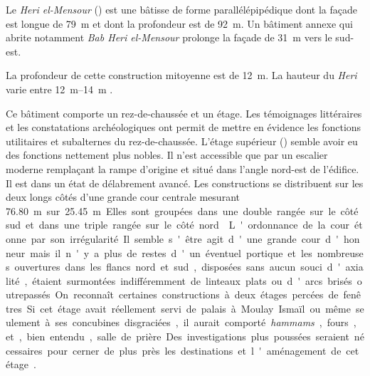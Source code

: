 Le \emph{Heri el-Mensour} () est une bâtisse de forme 
parallélépipédique dont la façade est longue de \SI{79}{\m} et dont la 
profondeur est de \SI{92}{\m}. Un bâtiment annexe qui abrite notamment 
\emph{Bab Heri el-Mensour} prolonge la façade de \SI{31}{\m} vers le 
sud-est.

La profondeur de cette construction mitoyenne est de \SI{12}{\m}. 
La hauteur du \emph{Heri} varie entre 
\SIrange[range-phrase=\ et\ ]{12}{14}{\m} \autocite{Barrucand_1976}.


Ce bâtiment comporte un rez-de-chaussée et un étage. Les témoignages 
littéraires et les constatations archéologiques ont permit de mettre 
en évidence les fonctions utilitaires et subalternes du 
rez-de-chaussée. L'étage supérieur () semble avoir eu 
des fonctions nettement plus nobles. Il n'est accessible que par un 
escalier moderne remplaçant la rampe d'origine et situé dans l'angle 
nord-est de l'édifice. Il est dans un état de délabrement avancé. Les 
constructions se distribuent sur les deux longs côtés d'une grande 
cour centrale mesurant \SI{76.80}m sur \SI{25.45}{\m} Elles sont 
groupées dans une double rangée sur le côté sud et dans une triple 
rangée sur le côté nord \autocite{Barrucand_1976}.

L'ordonnance de la cour étonne par son irrégularité. Il semble s'être 
agit d'une grande cour d'honneur mais il n'y a plus de restes d'un 
éventuel portique et les nombreuses ouvertures dans les flancs nord 
et sud, disposées sans aucun souci d'axialité, étaient surmontées 
indifféremment de linteaux plats ou d'arcs brisés outrepassés. On 
reconnaît certaines constructions à deux étages percées de fenêtres. 
Si cet étage avait réellement servi de palais à Moulay Ismaïl ou 
même seulement à ses concubines disgraciées, il aurait comporté 
\emph{hammams}, fours, et, bien entendu, salle de prière. 
Des investigations plus poussées seraient nécessaires pour cerner 
de plus près les destinations et l'aménagement de cet étage 
\autocite{Barrucand_1976}.


